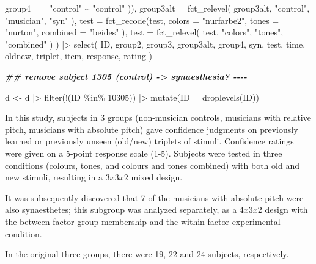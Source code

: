 \documentclass[
  man,floatsintext]{apa7}
\newenvironment{Shaded}{\begin{snugshade}}{\end{snugshade}}
\newcommand{\AttributeTok}[1]{\textcolor[rgb]{0.77,0.63,0.00}{#1}}
\newcommand{\DecValTok}[1]{\textcolor[rgb]{0.00,0.00,0.81}{#1}}
\newcommand{\DocumentationTok}[1]{\textcolor[rgb]{0.56,0.35,0.01}{\textbf{\textit{#1}}}}
\newcommand{\FunctionTok}[1]{\textcolor[rgb]{0.00,0.00,0.00}{#1}}
\newcommand{\NormalTok}[1]{#1}
\newcommand{\OtherTok}[1]{\textcolor[rgb]{0.56,0.35,0.01}{#1}}
\newcommand{\SpecialCharTok}[1]{\textcolor[rgb]{0.00,0.00,0.00}{#1}}
\newcommand{\StringTok}[1]{\textcolor[rgb]{0.31,0.60,0.02}{#1}}
\begin{document}
\begin{Shaded}
\begin{Highlighting}[]
\NormalTok{      group4 }\SpecialCharTok{==} \StringTok{"control"} \SpecialCharTok{\textasciitilde{}} \StringTok{"control"}
\NormalTok{    )),}
    \AttributeTok{group3alt =} \FunctionTok{fct\_relevel}\NormalTok{(}
\NormalTok{      group3alt, }\StringTok{"control"}\NormalTok{, }\StringTok{"musician"}\NormalTok{, }\StringTok{"syn"}
\NormalTok{    ),}
    \AttributeTok{test =} \FunctionTok{fct\_recode}\NormalTok{(test,}
      \AttributeTok{colors =} \StringTok{"nurfarbe2"}\NormalTok{,}
      \AttributeTok{tones =} \StringTok{"nurton"}\NormalTok{,}
      \AttributeTok{combined =} \StringTok{"beides"}
\NormalTok{    ),}
    \AttributeTok{test =} \FunctionTok{fct\_relevel}\NormalTok{(}
\NormalTok{      test, }\StringTok{"colors"}\NormalTok{, }\StringTok{"tones"}\NormalTok{, }\StringTok{"combined"}
\NormalTok{    )}
\NormalTok{  ) }\SpecialCharTok{|\textgreater{}}
  \FunctionTok{select}\NormalTok{(}
\NormalTok{    ID, group2, group3, group3alt, group4, syn, test,}
\NormalTok{    time, oldnew, triplet, item, response,}
\NormalTok{    rating}
\NormalTok{  )}



\DocumentationTok{\#\# remove subject 1305 (control) {-}\textgreater{} synaesthesia? {-}{-}{-}{-}}

\NormalTok{d }\OtherTok{\textless{}{-}}\NormalTok{ d }\SpecialCharTok{|\textgreater{}}
  \FunctionTok{filter}\NormalTok{(}\SpecialCharTok{!}\NormalTok{(ID }\SpecialCharTok{\%in\%} \DecValTok{10305}\NormalTok{)) }\SpecialCharTok{|\textgreater{}}
  \FunctionTok{mutate}\NormalTok{(}\AttributeTok{ID =} \FunctionTok{droplevels}\NormalTok{(ID))}
\end{Highlighting}
\end{Shaded}

In this study, subjects in 3 groups (non-musician controls, musicians with relative pitch, musicians with absolute pitch) gave confidence judgments on previously learned or previously unseen (old/new) triplets of stimuli. Confidence ratings were given on a 5-point response scale (1-5). Subjects were tested in three conditions (colours, tones, and colours and tones combined) with both old and new stimuli, resulting in a \(3 x 3 x 2\) mixed design.

It was subsequently discovered that 7 of the musicians with absolute pitch were also synaesthetes; this subgroup was analyzed separately, as a \(4 x 3 x 2\) design with the between factor group membership and the within factor experimental condition.

In the original three groups, there were 19, 22 and 24 subjects, respectively.
\end{document}
